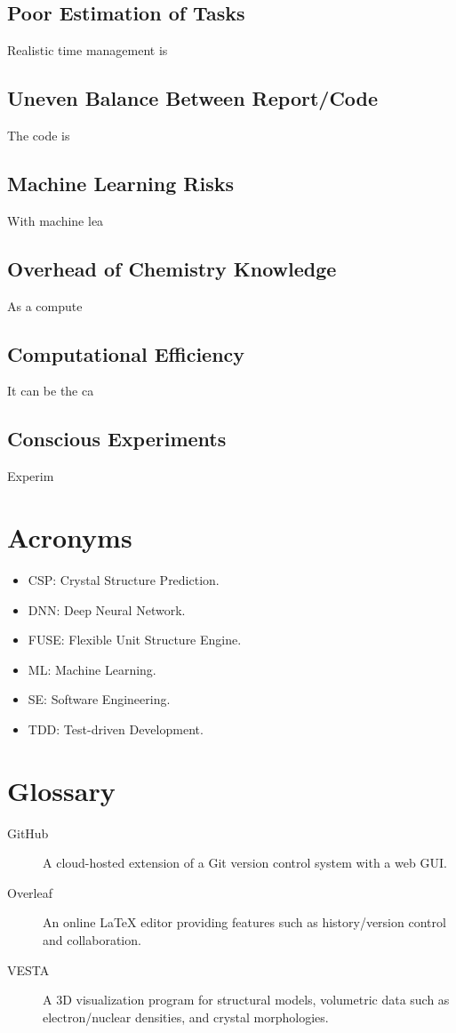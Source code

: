 \documentclass[12pt]{article}
\begin{document}
\subsection{Poor Estimation of Tasks}
Realistic time management is 

\subsection{Uneven Balance Between Report/Code}
The code is

\subsection{Machine Learning Risks}
With machine lea

\subsection{Overhead of Chemistry Knowledge}
As a compute

\subsection{Computational Efficiency}
It can be the ca

\subsection{Conscious Experiments}
Experim

\section*{Acronyms}
\begin{itemize}
    \item CSP: Crystal Structure Prediction.
    \item DNN: Deep Neural Network.
    \item FUSE: Flexible Unit Structure Engine.
    \item ML: Machine Learning.
    \item SE: Software Engineering.
    \item TDD: Test-driven Development.
\end{itemize}

\section*{Glossary}
\begin{description}
    \item[GitHub] A cloud-hosted extension of a Git version control system with a web GUI.
    \item[Overleaf] An online LaTeX editor providing features such as history/version control and collaboration.
    \item[VESTA] A 3D visualization program for structural models, volumetric data such as electron/nuclear densities, and crystal morphologies.
\end{description}
\end{document}
